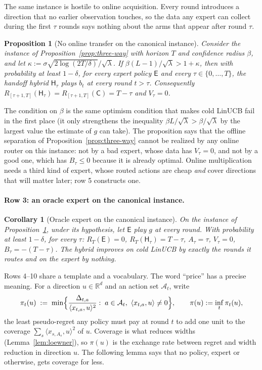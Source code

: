 \documentclass{article}
\newtheorem{proposition}{Proposition}
\newtheorem{corollary}{Corollary}
\theoremstyle{definition}
\theoremstyle{remark}
\newcommand{\R}{\mathbb{R}}
\theoremstyle{remark}
\newcommand{\Cold}{\mathsf{C}}
\newcommand{\Exp}{\mathsf{E}}
\newcommand{\Hyb}{\mathsf{H}}
\begin{document}
The same instance is hostile to online acquisition. Every round introduces a
direction that no earlier observation touches, so the data any expert can
collect during the first $\tau$ rounds says nothing about the arms that appear
after round $\tau$.

\begin{proposition}[No online transfer on the canonical instance]
\label{prop:one-pass}
Consider the instance of Proposition~\ref{prop:three-way} with horizon $T$
and confidence radius $\beta$, and let $\kappa:=\sigma\sqrt{2\log(2T/\delta)}/\sqrt\lambda$.
If $\beta(L-1)/\sqrt\lambda>1+\kappa$, then with probability at least
$1-\delta$, for \emph{every} expert policy $\Exp$ and every $\tau\in\{0,\dots,T\}$,
the handoff hybrid $\Hyb_\tau$ plays $b_t$ at every round $t>\tau$. Consequently
$R_{[\tau+1,T]}(\Hyb_\tau)=R_{[\tau+1,T]}(\Cold)=T-\tau$ and $V_\tau=0$.
\end{proposition}

The condition on $\beta$ is the same optimism condition that makes cold LinUCB
fail in the first place (it only strengthens the inequality
$\beta L/\sqrt\lambda>\beta/\sqrt\lambda$ by the largest value the estimate of
$g$ can take). The proposition says that the offline separation of
Proposition~\ref{prop:three-way} cannot be realized by any online router on
this instance: not by a bad expert, whose data has $V_\tau=0$, and not by a
good one, which has $B_\tau\le0$ because it is already optimal. Online
multiplication needs a third kind of expert, whose routed actions are cheap
\emph{and} cover directions that will matter later; row 5 constructs one.


\paragraph{Row 3: an oracle expert on the canonical instance.}
\begin{corollary}[Oracle expert on the canonical instance]
\label{cor:cat-oracle}
On the instance of Proposition~\ref{prop:one-pass}, under its hypothesis, let
$\Exp$ play $g$ at every round. With probability at least $1-\delta$, for every
$\tau$: $R_T(\Exp)=0$, $R_T(\Hyb_\tau)=T-\tau$, $A_\tau=\tau$, $V_\tau=0$,
$B_\tau=-(T-\tau)$. The hybrid improves on cold LinUCB by exactly the rounds
it routes and on the expert by nothing.
\end{corollary}


Rows 4--10 share a template and a vocabulary. The word ``price'' has a precise meaning. For a direction $u\in\R^d$ and an
action set $\mathcal A_t$, write
\begin{equation}
\label{eq:price}
\pi_t(u)\;:=\;\min\Bigl\{\frac{\Delta_{t,a}}{\langle x_{t,a},u\rangle^2}:\;a\in\mathcal A_t,\ \langle x_{t,a},u\rangle\neq0\Bigr\},
\qquad \pi(u):=\inf_t\pi_t(u),
\end{equation}
the least pseudo-regret any policy must pay at round $t$ to add one unit to
the coverage $\sum_s\langle x_{s,A_s},u\rangle^2$ of $u$. Coverage is what
reduces widths (Lemma~\ref{lem:loewner}), so $\pi(u)$ is the exchange rate
between regret and width reduction in direction $u$. The following lemma
says that no policy, expert or otherwise, gets coverage for less.
\end{document}
